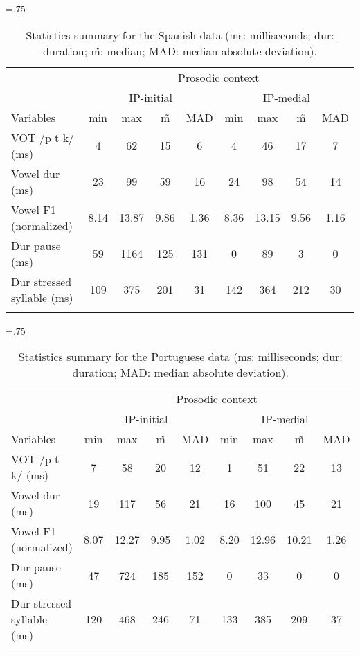 \documentclass[output=paper]{langscibook}
\begin{document}
\begin{paperappendix}
\begin{table}[H]
\small\tabcolsep=.75\tabcolsep
\caption{Statistics summary for the Spanish data (ms: milliseconds; dur: duration; \~m: median; MAD: median absolute deviation).}
\label{tab:table:D2}
\begin{tabular}{lcccccccc}
  \lsptoprule
            & \multicolumn{8}{c}{Prosodic context}\\\cmidrule(lr){2-9}
            & \multicolumn{4}{c}{IP-initial} & \multicolumn{4}{c}{IP-medial}\\\cmidrule(lr){2-5}\cmidrule(lr){6-9}
Variables & min & max & \~m & MAD & min & max & \~m & MAD\\\midrule
VOT /p t k/ (ms) & 4	& 62	& 15  & 6 &	4	 & 46 &	17  & 7\\
Vowel dur (ms) & 23 &	99 &	59  & 16 & 24	& 98	& 54   & 14\\
Vowel F1  (normalized) & 8.14 &	13.87 &	9.86  & 1.36 &	8.36 &	13.15	& 9.56  & 1.16\\
Dur pause  (ms) & 59 &	1164 &	125  & 131 &	0 &	89 &	3  & 0 \\
Dur stressed  syllable (ms) & 109	 & 375 &	201  & 31 &	142 &	364 &	212  & 30 \\
\lspbottomrule
\end{tabular}
\end{table}



\begin{table}[H]
\small\tabcolsep=.75\tabcolsep
\caption{Statistics summary for the Portuguese data (ms: milliseconds; dur: duration; MAD: median absolute deviation).}
\label{tab:table:D3}
\begin{tabular}{lcccccccc}
  \lsptoprule
            & \multicolumn{8}{c}{Prosodic context}\\\cmidrule(lr){2-9}
            & \multicolumn{4}{c}{IP-initial} & \multicolumn{4}{c}{IP-medial}\\\cmidrule(lr){2-5}\cmidrule(lr){6-9}
Variables & min & max & \~m & MAD & min & max & \~m & MAD\\\midrule
VOT /p t k/ (ms)	        & 7	& 58 &	20  & 12&	1	 & 51  &	22  & 13\\
Vowel dur (ms)	            & 19 &	117 &	56  & 21&	16 &	100 &	45  & 21\\
Vowel F1 (normalized)	    & 8.07 &	12.27 &	9.95  & 1.02	& 8.20	 & 12.96 &	10.21  & 1.26\\
Dur pause (ms)	            & 47 &	724 &	185  & 152&	0	 & 33 &	0  & 0\\
Dur stressed syllable (ms)	&  120 &	468 &	246  & 71&	133 &	385 &	209  & 37\\
\lspbottomrule
\end{tabular}
\end{table}


\end{paperappendix}
\end{document}
